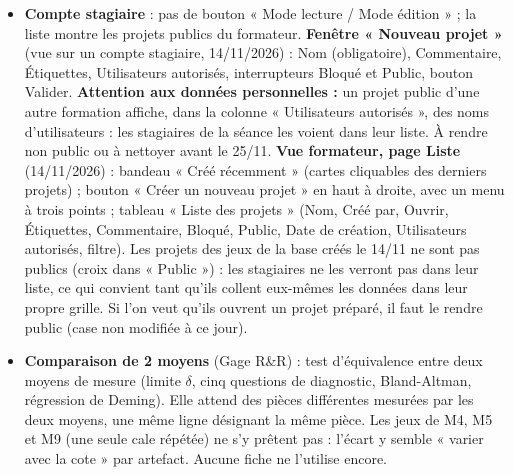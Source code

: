 \documentclass[10pt,a4paper]{article}
\begin{document}
\begin{itemize}
\item \textbf{Compte stagiaire} : pas de bouton « Mode lecture / Mode édition » ; la liste montre les projets publics du formateur. \textbf{Fenêtre « Nouveau projet »} (vue sur un compte stagiaire, 14/11/2026) : Nom (obligatoire), Commentaire, Étiquettes, Utilisateurs autorisés, interrupteurs Bloqué et Public, bouton Valider. \textbf{Attention aux données personnelles :} un projet public d'une autre formation affiche, dans la colonne « Utilisateurs autorisés », des noms d'utilisateurs : les stagiaires de la séance les voient dans leur liste. À rendre non public ou à nettoyer avant le 25/11. \textbf{Vue formateur, page Liste} (14/11/2026) : bandeau « Créé récemment » (cartes cliquables des derniers projets) ; bouton « Créer un nouveau projet » en haut à droite, avec un menu à trois points ; tableau « Liste des projets » (Nom, Créé par, Ouvrir, Étiquettes, Commentaire, Bloqué, Public, Date de création, Utilisateurs autorisés, filtre). Les projets des jeux de la base créés le 14/11 ne sont pas publics (croix dans « Public ») : les stagiaires ne les verront pas dans leur liste, ce qui convient tant qu'ils collent eux-mêmes les données dans leur propre grille. Si l'on veut qu'ils ouvrent un projet préparé, il faut le rendre public (case non modifiée à ce jour).
\item \textbf{Comparaison de 2 moyens} (Gage R\&R) : test d'équivalence entre deux moyens de mesure (limite $\delta$, cinq questions de diagnostic, Bland-Altman, régression de Deming). Elle attend des pièces différentes mesurées par les deux moyens, une même ligne désignant la même pièce. Les jeux de M4, M5 et M9 (une seule cale répétée) ne s'y prêtent pas : l'écart y semble « varier avec la cote » par artefact. Aucune fiche ne l'utilise encore.

\end{itemize}
\end{document}
